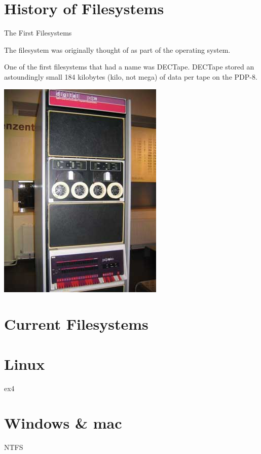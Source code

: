 \documentclass{lug}
\newcommand{\splitslide}[4]{
    \noindent
    \begin{minipage}{#1 \textwidth - #2 }
        #3
    \end{minipage}%
    \hspace{ \dimexpr #2 * 2 \relax }%
    \begin{minipage}{\textwidth - #1 \textwidth - #2 }
        #4
    \end{minipage}
}
\begin{document}
\section{History of Filesystems}
\begin{frame}{The First Filesystems}
    \splitslide{0.60}{1em}{
    The filesystem was originally thought of as part of the operating system.

    One of the first filesystems that had a name was DECTape. DECTape stored an
    astoundingly small 184 kilobytes (kilo, not mega) of data per tape on the
    PDP-8.
    }{\includegraphics[width=0.4\textheight]{./graphics/dectape.jpg}}
\end{frame}

\section{Current Filesystems}

\section{Linux}
\begin{frame}{ex4}
\end{frame}

\section{Windows \& mac}
\begin{frame}{NTFS}
\end{frame}
\end{document}

